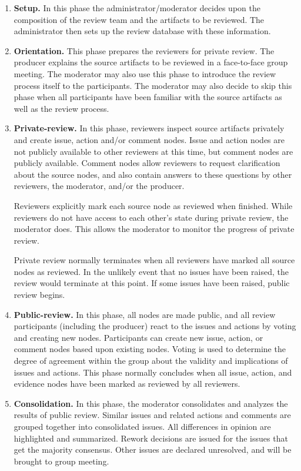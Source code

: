 \begin{enumerate}
\item {\bf Setup.} In this phase the administrator/moderator decides
upon the composition of the review team and the artifacts to be reviewed.
The administrator then sets up the review database with these
information. 

\item {\bf Orientation.} 
This phase prepares the reviewers for private review. 
The producer explains the source artifacts to be reviewed in a
face-to-face group meeting.
The moderator may also use this phase to introduce the review process
itself to the participants.
The moderator may also decide to skip this phase when all
participants have been familiar with the source artifacts as well as
the review process.
\item {\bf Private-review.}
In this phase, reviewers inspect source artifacts privately and create
issue, action and/or comment nodes. Issue and action nodes are not
publicly available to other reviewers at this time, but comment nodes
are publicly available. Comment nodes allow reviewers to request
clarification about the source nodes, and also contain answers to
these questions by other reviewers, the moderator, and/or the
producer. 

Reviewers explicitly mark each source node as reviewed when
finished.  While reviewers do not have access to each other's state
during private review, the moderator does. This allows the moderator
to monitor the progress of private review. 

Private review normally terminates when all reviewers have marked all
source nodes as reviewed. In the unlikely event that no issues have
been raised, the review would terminate at this point.
If some issues have been raised, public review begins.

\item{\bf Public-review.}
In this phase, all nodes are made public, and all review participants
(including the producer) react to the issues and actions by voting and
creating new nodes. 
Participants can create new issue, action, or comment nodes based upon
existing nodes. Voting is used to determine the degree of agreement
within the group about the validity and implications of issues and
actions. This phase normally concludes when all issue, action, and
evidence nodes have been marked as reviewed by all reviewers.

\item {\bf Consolidation.} 
In this phase, the moderator consolidates and analyzes the results of
public review. Similar issues and related actions and comments are
grouped together into consolidated issues. All differences in opinion
are highlighted and summarized. Rework decisions are issued for the
issues that get the majority consensus. Other issues are declared
unresolved, and will be brought to group meeting.


\end{enumerate}
